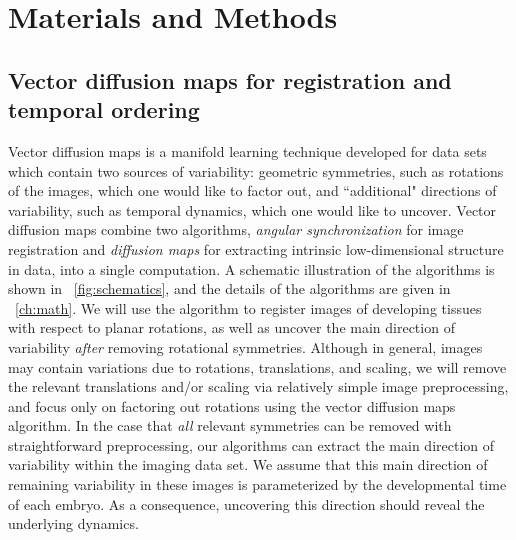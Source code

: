 \section{Materials and Methods}






\subsection{Vector diffusion maps for registration and temporal ordering}

Vector diffusion maps \citep{singer2012vector} is a manifold learning
technique developed for data sets which contain two sources of variability:
geometric symmetries, such as rotations of the images, which one would like to factor out,
and ``additional" directions of variability, such as temporal dynamics, which one would like to uncover.
%
Vector diffusion maps combine two algorithms, {\em angular synchronization} \citep{singer2011angular} for image registration and {\em diffusion maps} \citep{coifman2005geometric} for extracting intrinsic low-dimensional structure in data, into a single computation.
%
A schematic illustration of the algorithms is shown in \fig~\ref{fig:schematics}, and the details of the algorithms are given in \chap~\ref{ch:math}.
%
We will use the algorithm to register images of developing tissues with respect to planar rotations, as well as uncover the main direction of variability {\it after} removing rotational symmetries.
%
Although in general, images may contain variations due to rotations, translations, and scaling, we will remove the relevant translations and/or scaling via relatively simple image preprocessing, and focus only on factoring out rotations using the vector diffusion maps algorithm.
%
In the case that {\em all} relevant symmetries can be removed with straightforward preprocessing, our algorithms can extract the main direction of variability within the imaging data set.
%
We assume that this main direction of remaining variability in these images is parameterized by the developmental time of each embryo.
%
As a consequence, uncovering this direction should reveal the underlying dynamics.


